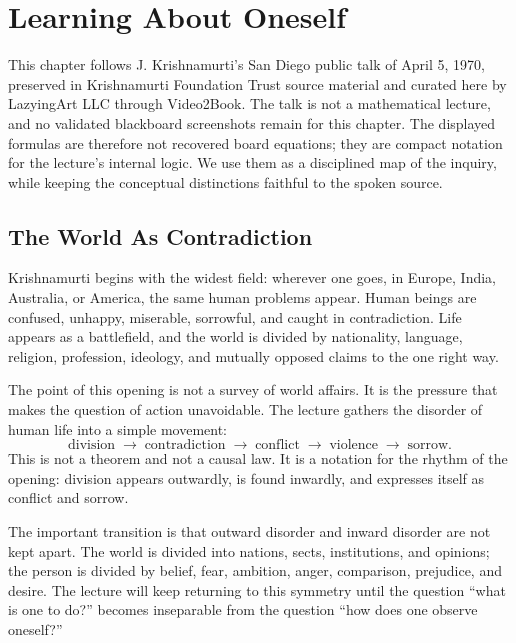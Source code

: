 \chapter{Learning About Oneself}

This chapter follows J. Krishnamurti's San Diego public talk of April 5, 1970, preserved in Krishnamurti Foundation Trust source material and curated here by LazyingArt LLC through Video2Book. The talk is not a mathematical lecture, and no validated blackboard screenshots remain for this chapter. The displayed formulas are therefore not recovered board equations; they are compact notation for the lecture's internal logic. We use them as a disciplined map of the inquiry, while keeping the conceptual distinctions faithful to the spoken source.

\section{The World As Contradiction}

Krishnamurti begins with the widest field: wherever one goes, in Europe, India, Australia, or America, the same human problems appear. Human beings are confused, unhappy, miserable, sorrowful, and caught in contradiction. Life appears as a battlefield, and the world is divided by nationality, language, religion, profession, ideology, and mutually opposed claims to the one right way.

The point of this opening is not a survey of world affairs. It is the pressure that makes the question of action unavoidable. The lecture gathers the disorder of human life into a simple movement:
\begin{equation}
\text{division}
\;\longrightarrow\;
\text{contradiction}
\;\longrightarrow\;
\text{conflict}
\;\longrightarrow\;
\text{violence}
\;\longrightarrow\;
\text{sorrow}.
\end{equation}
This is not a theorem and not a causal law. It is a notation for the rhythm of the opening: division appears outwardly, is found inwardly, and expresses itself as conflict and sorrow.

The important transition is that outward disorder and inward disorder are not kept apart. The world is divided into nations, sects, institutions, and opinions; the person is divided by belief, fear, ambition, anger, comparison, prejudice, and desire. The lecture will keep returning to this symmetry until the question ``what is one to do?'' becomes inseparable from the question ``how does one observe oneself?''

